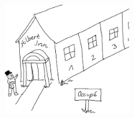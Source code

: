 \documentclass[12pt,compress,ngerman,utf8,t]{beamer}
\begin{document}
\begin{frame}
{\begin{columns}[b]
\begin{column}{0.65\textwidth}
    \end{column}
    \begin{column}{0.45\textwidth}
      \includegraphics[width=5.5cm]{hilberts-hotel}
      \vspace*{-0.4cm}
    \end{column}
  \end{columns}}
\end{frame}
\end{document}
